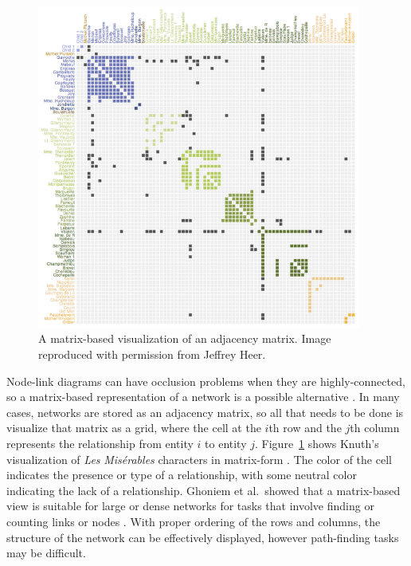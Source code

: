 \begin{figure}[h]
	\centering
	\includegraphics[width=0.95\textwidth]{figures/png/matrix.png}
	\caption[A matrix-based visualization of an adjacency matrix]{A matrix-based visualization of an adjacency matrix.  Image reproduced with permission from Jeffrey Heer.}
	\label{fig:matrix}
\end{figure}

Node-link diagrams can have occlusion problems when they are highly-connected, so a matrix-based representation of a network is a possible alternative \cite{heer2010}.  In many cases, networks are stored as an adjacency matrix, so all that needs to be done is visualize that matrix as a grid, where the cell at the $i$th row and the $j$th column represents the relationship from entity $i$ to entity $j$.  Figure~\ref{fig:matrix} shows Knuth's visualization of \textit{Les} \textit{Mis\'erables} characters in matrix-form \cite{knuth1993}.  The color of the cell indicates the presence or type of a relationship, with some neutral color indicating the lack of a relationship.  Ghoniem et al.\ showed that a matrix-based view is suitable for large or dense networks for tasks that involve finding or counting links or nodes \citeyearpar{ghoniem2004}.  With proper ordering of the rows and columns, the structure of the network can be effectively displayed, however path-finding tasks may be difficult.

